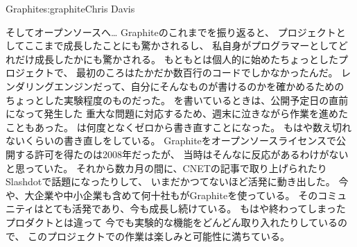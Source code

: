 \begin{aosachapter}{Graphite}{s:graphite}{Chris Davis}
\begin{aosasect1}{そしてオープンソースへ…}
Graphiteのこれまでを振り返ると、
プロジェクトとしてここまで成長したことにも驚かされるし、
私自身がプログラマーとしてどれだけ成長したかにも驚かされる。
もともとは個人的に始めたちょっとしたプロジェクトで、
最初のころはたかだか数百行のコードでしかなかったんだ。
レンダリングエンジンだって、自分にそんなものが書けるのかを確かめるための
ちょっとした実験程度のものだった。
を書いているときは、公開予定日の直前になって発生した
重大な問題に対応するため、週末に泣きながら作業を進めたこともあった。
は何度となくゼロから書き直すことになった。
もはや数え切れないくらいの書き直しをしている。
Graphiteをオープンソースライセンスで公開する許可を得たのは2008年だったが、
当時はそんなに反応があるわけがないと思っていた。
それから数カ月の間に、CNETの記事で取り上げられたり
Slashdotで話題になったりして、
いまだかつてないほど活発に動き出した。
今や、大企業や中小企業も含めて何十社もがGraphiteを使っている。
そのコミュニティはとても活発であり、今も成長し続けている。
もはや終わってしまったプロダクトとは違って
今でも実験的な機能をどんどん取り入れたりしているので、
このプロジェクトでの作業は楽しみと可能性に満ちている。

\end{aosasect1}

\end{aosachapter}
